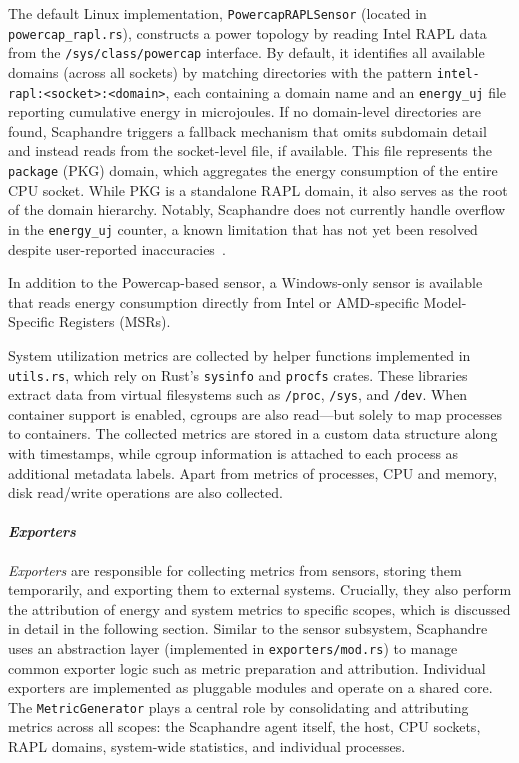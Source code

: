 The default Linux implementation, \texttt{PowercapRAPLSensor} (located in \texttt{powercap\_rapl.rs}), constructs a power topology by reading Intel RAPL data from the \texttt{/sys/class/powercap} interface. By default, it identifies all available domains (across all sockets) by matching directories with the pattern \texttt{intel-rapl:<socket>:<domain>}, each containing a domain name and an \texttt{energy\_uj} file reporting cumulative energy in microjoules. If no domain-level directories are found, Scaphandre triggers a fallback mechanism that omits subdomain detail and instead reads from the socket-level file, if available. This file represents the \texttt{package} (PKG) domain, which aggregates the energy consumption of the entire CPU socket. While PKG is a standalone RAPL domain, it also serves as the root of the domain hierarchy. Notably, Scaphandre does not currently handle overflow in the \texttt{energy\_uj} counter, a known limitation that has not yet been resolved despite user-reported inaccuracies~\cite{scaphandre_issue280}.

In addition to the Powercap-based sensor, a Windows-only sensor is available that reads energy consumption directly from Intel or AMD-specific Model-Specific Registers (MSRs).

System utilization metrics are collected by helper functions implemented in \texttt{utils.rs}, which rely on Rust’s \texttt{sysinfo} and \texttt{procfs} crates. These libraries extract data from virtual filesystems such as \texttt{/proc}, \texttt{/sys}, and \texttt{/dev}. When container support is enabled, cgroups are also read—but solely to map processes to containers. The collected metrics are stored in a custom data structure along with timestamps, while cgroup information is attached to each process as additional metadata labels. Apart from metrics of processes, CPU and memory, disk read/write operations are also collected.

\paragraph{\textit{Exporters}}
\textit{Exporters} are responsible for collecting metrics from sensors, storing them temporarily, and exporting them to external systems. Crucially, they also perform the attribution of energy and system metrics to specific scopes, which is discussed in detail in the following section. Similar to the sensor subsystem, Scaphandre uses an abstraction layer (implemented in \texttt{exporters/mod.rs}) to manage common exporter logic such as metric preparation and attribution. Individual exporters are implemented as pluggable modules and operate on a shared core. The \texttt{MetricGenerator} plays a central role by consolidating and attributing metrics across all scopes: the Scaphandre agent itself, the host, CPU sockets, RAPL domains, system-wide statistics, and individual processes.

